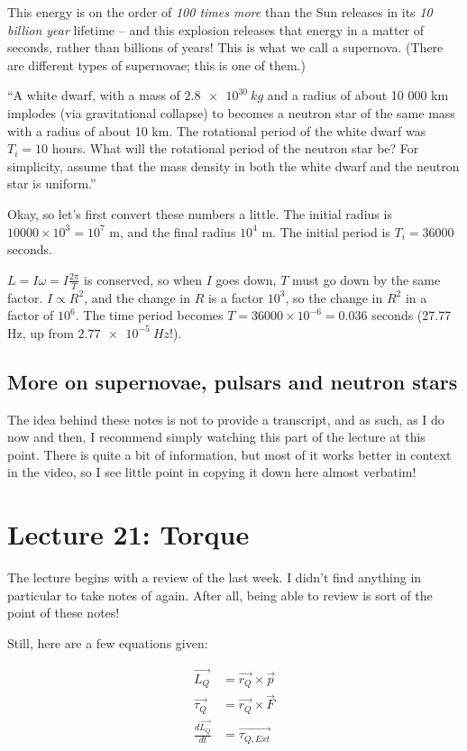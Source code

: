 This energy is on the order of \emph{100 times more} than the Sun releases in its \emph{10 billion year} lifetime -- and this explosion releases that energy in a matter of seconds, rather than billions of years! This is what we call a supernova. (There are different types of supernovae; this is one of them.)

``A white dwarf, with a mass of $\SI{2.8e30}{kg}$ and a radius of about 10 000 km implodes (via gravitational collapse) to becomes a neutron star of the same mass with a radius of about 10 km. The rotational period of the white dwarf was $T_i = 10$ hours. What will the rotational period of the neutron star be? For simplicity, assume that the mass density in both the white dwarf and the neutron star is uniform.''

Okay, so let's first convert these numbers a little. The initial radius is $10000\times10^3 = 10^7$ m, and the final radius $10^4$ m. The initial period is $T_i = 36000$ seconds.

$\displaystyle L = I \omega = I \frac{2 \pi}{T}$ is conserved, so when $I$ goes down, $T$ must go down by the same factor. $I \propto R^2$, and the change in $R$ is a factor $10^3$, so the change in $R^2$ in a factor of $10^6$. The time period becomes $T = 36000 \times 10^{-6} = 0.036$ seconds (27.77 Hz, up from $\SI{2.77e-5}{Hz}$!).

\subsection{More on supernovae, pulsars and neutron stars}

The idea behind these notes is not to provide a transcript, and as such, as I do now and then, I recommend simply watching this part of the lecture at this point. There is quite a bit of information, but most of it works better in context in the video, so I see little point in copying it down here almost verbatim!

\section{Lecture 21: Torque}

The lecture begins with a review of the last week. I didn't find anything in particular to take notes of again. After all, being able to review is sort of the point of these notes!

Still, here are a few equations given:

\begin{align}
\vec{L_Q} &= \vec{r_Q} \times \vec{p}\\
\vec{\tau_Q} &= \vec{r_Q} \times \vec{F}\\
\frac{d\vec{L_Q}}{dt} &= \vec{\tau_{Q,Ext}}
\end{align}

